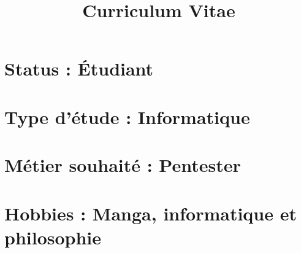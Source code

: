 \documentclass{article}
\title{Curriculum Vitae}
\begin{document}
\section{Status : Étudiant}
\section{Type d'étude : Informatique}
\section{Métier souhaité : Pentester}
\section{Hobbies : Manga, informatique et philosophie}
\end{document}
